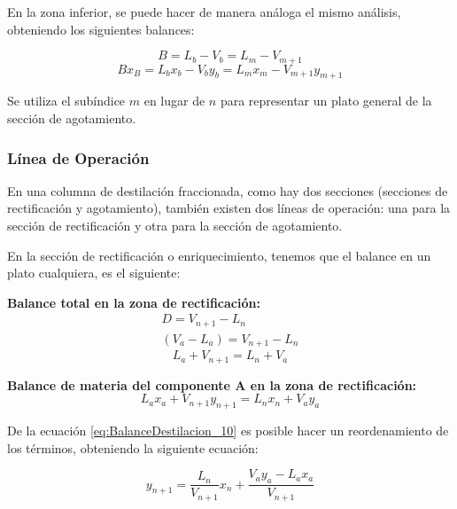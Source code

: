 \documentclass[11pt]{book}
\begin{document}
En la zona inferior, se puede hacer de manera análoga el mismo análisis, obteniendo los siguientes balances:

\begin{equation}
    \label{eq:BalanceDestilacion_7}
    B = L_b - V_b = L_m - V_{m+1}
\end{equation}
\begin{equation}
    \label{eq:BalanceDestilacion_8}
    B x_B = L_b x_b - V_b y_b =  L_m x_m - V_{m+1} y_{m+1}
\end{equation}

Se utiliza el subíndice $m$ en lugar de $n$ para representar un plato general de la sección de agotamiento.

\subsubsection{Línea de Operación}

En una columna de destilación fraccionada, como hay dos secciones (secciones de rectificación y agotamiento), también existen dos líneas de operación: una para la sección de rectificación y otra para la sección de agotamiento. 

En la sección de rectificación o enriquecimiento, tenemos que el balance en un plato cualquiera, es el siguiente:

\textbf{Balance total en la zona de rectificación:}
\begin{align*}
    D = V_{n+1} - L_n \\
    (V_a-L_a) = V_{n+1} - L_n
\end{align*}
\begin{equation}
    \label{eq:BalanceDestilacion_9}
    L_a + V_{n+1} = L_n + V_a
\end{equation}

\textbf{Balance de materia del componente A en la zona de rectificación:}
\begin{equation}
    \label{eq:BalanceDestilacion_10}
    L_a x_a + V_{n+1} y_{n+1} = L_n x_n + V_a y_a
\end{equation}

De la ecuación \ref{eq:BalanceDestilacion_10} es posible hacer un reordenamiento de los términos, obteniendo la siguiente ecuación:

\begin{equation}
    \label{eq:BalanceDestilacion_11}
    y_{n+1} = \frac{L_n}{V_{n+1}} x_n + \frac{V_a y_a - L_a x_a}{V_{n+1}}
\end{equation}
\end{document}
